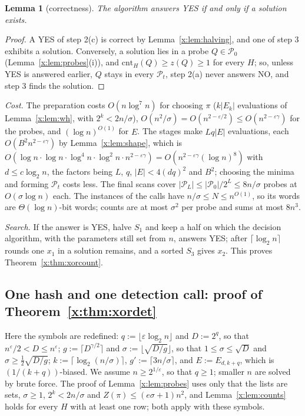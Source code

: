 \documentclass[11pt]{article}
\newtheorem{lemma}[theorem]{Lemma}
\theoremstyle{definition}
\theoremstyle{remark}
\newcommand{\cnt}{\mathrm{cnt}}
\newcommand{\Pq}{\mathcal{P}}
\begin{document}
\begin{lemma}[correctness]\label{x:lem:correct}
The algorithm answers YES if and only if a solution exists.
\end{lemma}
\begin{proof}
A YES of step 2(c) is correct by Lemma~\ref{x:lem:halving}, and one of step 3 exhibits a solution. Conversely, a solution lies in a probe $Q\in\Pq_0$ (Lemma~\ref{x:lem:probes}(i)), and $\cnt_H(Q)\ge z(Q)\ge1$ for every $H$; so, unless YES is answered earlier, $Q$ stays in every $\Pq_t$, step 2(a) never answers NO, and step 3 finds the solution.
\end{proof}

\emph{Cost.} The preparation costs $O(n\log^7n)$ for choosing $\pi$ ($k|E_k|$ evaluations of Lemma~\ref{x:lem:wh}, with $2^k<2n/\sigma$), $O(n^2/\sigma)=O(n^{2-\varepsilon/2})\le O(n^{2-\varepsilon\gamma})$ for the probes, and $(\log n)^{O(1)}$ for $E$. The stages make $Lq|E|$ evaluations, each $O(B^2n^{2-\varepsilon\gamma})$ by Lemma~\ref{x:lem:shape}, which is $O(\log n\cdot\log n\cdot\log^4n\cdot\log^2n\cdot n^{2-\varepsilon\gamma})=O(n^{2-\varepsilon\gamma}(\log n)^8)$ with $d\le c\log_2n$, the factors being $L$, $q$, $|E|<4(dq)^2$ and $B^2$; choosing the minima and forming $\Pq_t$ costs less. The final scans cover $|\Pq_L|\le|\Pq_0|/2^L\le8n/\sigma$ probes at $O(\sigma\log n)$ each. The instances of the calls have $n/\sigma\le N\le n^{O(1)}$, so its words are $\Theta(\log n)$-bit words; counts are at most $\sigma^2$ per probe and sums at most $8n^3$.

\emph{Search.} If the answer is YES, halve $S_1$ and keep a half on which the decision algorithm, with the parameters still set from $n$, answers YES; after $\lceil\log_2n\rceil$ rounds one $x_1$ in a solution remains, and a sorted $S_3$ gives $x_2$. This proves Theorem~\ref{x:thm:xorcount}.

\subsection{One hash and one detection call: proof of Theorem~\ref{x:thm:xordet}}\label{x:sec:xordet}

Here the symbols are redefined: $q:=\lfloor\varepsilon\log_2n\rfloor$ and $D:=2^q$, so that $n^\varepsilon/2<D\le n^\varepsilon$; $g:=\lceil D^{\gamma/2}\rceil$ and $\sigma:=\lfloor\sqrt{D/g}\rfloor$, so that $1\le\sigma\le\sqrt D$ and $\sigma\ge\frac12\sqrt{D/g}$; $k:=\lceil\log_2(n/\sigma)\rceil$, $g':=\lceil3n/\sigma\rceil$, and $E:=E_{d,k+q}$, which is $(1/(k+q))$-biased. We assume $n\ge2^{1/\varepsilon}$, so that $q\ge1$; smaller $n$ are solved by brute force. The proof of Lemma~\ref{x:lem:probes} uses only that the lists are sets, $\sigma\ge1$, $2^k<2n/\sigma$ and $Z(\pi)\le(e\sigma+1)n^2$, and Lemma~\ref{x:lem:counts} holds for every $H$ with at least one row; both apply with these symbols.
\end{document}
